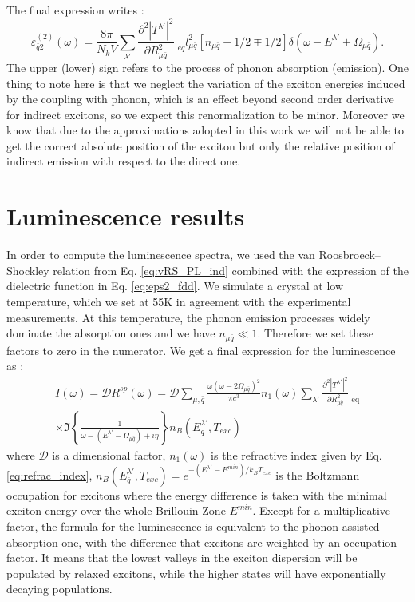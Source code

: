 The final expression writes :
\begin{equation}
	\varepsilon^{(2)}_{\bar{q}2}(\omega) = \frac{8\pi}{N_k V} \sum_{\lambda'} \frac{\partial^2 |T^{\lambda'}|^2}{\partial R^2_{\mu\bar{q}}}\biggr|_{eq} l^2_{\mu\bar{q}} \left[ n_{\mu\bar{q}} + 1/2 \mp 1/2 \right] \delta(\omega - E^{\lambda'} \pm \Omega_{\mu\bar{q}}). \label{eq:eps2_fdd}
\end{equation}
The upper (lower) sign refers to the process of phonon absorption (emission). One thing to note here is that we neglect the variation of the exciton energies induced by the coupling with phonon, which is an effect beyond second order derivative for indirect excitons, so we expect this renormalization to be minor.\cite{marini2008ab} Moreover we know that due to the approximations adopted in this work we will not be able to get the correct absolute position\cite{artus2021ellipsometry} of the exciton but only the relative position of indirect emission with respect to the direct one. 

%
\section{Luminescence results} \label{sec:PL_fdd}
In order to compute the luminescence spectra, we used the van Roosbroeck--Shockley relation from Eq. \eqref{eq:vRS_PL_ind} combined with the expression of the dielectric function in Eq. \eqref{eq:eps2_fdd}. We simulate a crystal at low temperature, which we set at 55K in agreement with the experimental measurements. At this temperature, the phonon emission processes widely dominate the absorption ones and we have $n_{\mu \bar{q}} \ll  1$. Therefore we set these factors to zero in the numerator. We get a final expression for the luminescence as :
\begin{multline}
	I(\omega) = \mathcal{D} R^{sp}(\omega)= \mathcal{D} \sum_{\mu,{\bar{q}}} \frac{\omega(\omega - 2\Omega_{\mu \bar{q}})^2}{\pi c^3 } n_1(\omega) \sum_{\lambda'} \frac{\partial^2 |T^{\lambda'}|^2 }{\partial R_{\mu\bar{q}}^2}\biggr|_{\text{eq}} \\ \times	\Im \left\{\frac{1}{\omega-(E^{\lambda'}-\Omega_{\mu \bar{q}})+i\eta}\right\} n_B(E^{\lambda'}_{\bar{q}},T_{exc}) \label{eq:strain_vRS_PL}
\end{multline}
where $\mathcal{D}$ is a dimensional factor, $n_1(\omega)$ is the refractive index given by Eq. \eqref{eq:refrac_index}, $n_B(E^{\lambda'}_{\bar{q}},T_{exc}) = e^{-(E^{\lambda'}-E^{min})/k_BT_{exc}}$ is the Boltzmann occupation for excitons where the energy difference is taken with the minimal exciton energy over the whole Brillouin Zone $E^{min}$. Except for a multiplicative factor, the formula for the luminescence is equivalent to the phonon-assisted absorption one, with the difference that excitons are weighted by an occupation factor. It means that the lowest valleys in the exciton dispersion will be populated by relaxed excitons, while the higher states will have exponentially decaying populations.

